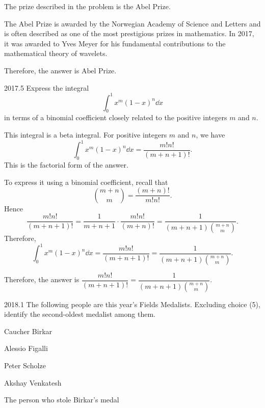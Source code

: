     \begin{solution}
        The prize described in the problem is the Abel Prize.

        The Abel Prize is awarded by the Norwegian Academy of Science and Letters and is often
        described as one of the most prestigious prizes in mathematics. In 2017, it was awarded to
        Yves Meyer for his fundamental contributions to the mathematical theory of wavelets.

        Therefore, the answer is $\boxed{\text{Abel Prize}}$.
    \end{solution}

    \begin{pastproblem}{2017.5}
        Express the integral
        \[
            \int_0^1 x^m(1-x)^n\dd x
        \]
        in terms of a binomial coefficient closely related to the positive integers $m$ and $n$.
    \end{pastproblem}

    \begin{solution}
        This integral is a beta integral. For positive integers $m$ and $n$, we have
        \[
            \int_0^1 x^m(1-x)^n\dd x
            =
            \frac{m!n!}{(m+n+1)!}.
        \]
        This is the factorial form of the answer.

        To express it using a binomial coefficient, recall that
        \[
            \binom{m+n}{m}
            =
            \frac{(m+n)!}{m!n!}.
        \]
        Hence
        \[
            \frac{m!n!}{(m+n+1)!}
            =
            \frac{1}{m+n+1}\cdot\frac{m!n!}{(m+n)!}
            =
            \frac{1}{(m+n+1)\binom{m+n}{m}}.
        \]
        Therefore,
        \[
            \int_0^1 x^m(1-x)^n\dd x
            =
            \frac{m!n!}{(m+n+1)!}
            =
            \frac{1}{(m+n+1)\binom{m+n}{m}}.
        \]

        Therefore, the answer is $\boxed{\dfrac{m!n!}{(m+n+1)!}
        =
        \dfrac{1}{(m+n+1)\binom{m+n}{m}}}$.
    \end{solution}

    \begin{pastproblem}{2018.1}
        The following people are this year's Fields Medalists. Excluding choice (5), identify the
        second-oldest medalist among them.
        \begin{problemchoices}
            \item Caucher Birkar
            \item Alessio Figalli
            \item Peter Scholze
            \item Akshay Venkatesh
            \item The person who stole Birkar's medal
        \end{problemchoices}
    \end{pastproblem}

